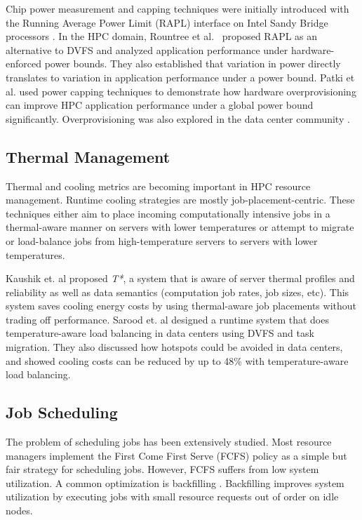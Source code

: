 Chip power measurement and capping techniques were initially introduced with the Running Average Power Limit (RAPL) interface on Intel Sandy Bridge processors \cite{IntelSDM,David2010}. In the HPC domain, Rountree et al.~\cite{Rountree2012} proposed RAPL as an alternative to DVFS and analyzed application performance under hardware-enforced power bounds. They also established that variation in power directly translates to variation in application performance under a power bound. Patki et al. \cite{Patki1} used power capping techniques to demonstrate how hardware overprovisioning can improve HPC application performance under a global power bound significantly. Overprovisioning was also explored in the data center community \cite{femal:04}.

\subsection{Thermal Management}
Thermal and cooling metrics are becoming important in HPC resource management. Runtime cooling strategies are mostly
job-placement-centric. These techniques either aim to place incoming computationally intensive jobs in a thermal-aware manner on servers with
lower temperatures or attempt to migrate or load-balance jobs from high-temperature servers to servers with lower temperatures.

Kaushik et. al \cite{kaushik_t*:_2012} proposed \emph{T*}, a system that is aware of server thermal profiles and reliability as well as data semantics (computation job rates, job sizes, etc). This system saves cooling energy costs by using thermal-aware job placements without trading off performance. Sarood et. al \cite{SaroodSC11} designed a runtime system that does temperature-aware load balancing in data centers using DVFS and task migration. They also discussed how hotspots could be avoided in data centers, and showed cooling costs can be reduced by up to 48\% with temperature-aware load balancing.

\subsection{Job Scheduling}
The problem of scheduling jobs has been extensively studied. Most resource managers implement the First Come First Serve (FCFS) policy
as a simple but fair strategy for scheduling jobs. However, FCFS suffers from low system utilization. A common optimization is backfilling
\cite{lifka_anl/ibm_1995,mualem_utilization_2001,feitelson_parallel_2004}. Backfilling improves system utilization by executing jobs with small resource requests out of order on idle nodes.

